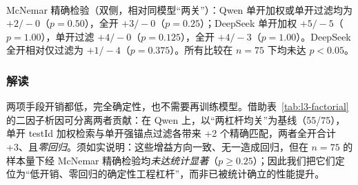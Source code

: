 \begin{table}[t]
\centering
\caption{L3 v0 $\to$ v1 端到端对比（75 个可达 koenig 失效）。v1 = v0 + testId 加权检索 + 强锚点后置过滤；v0 为两杠杆均关的统一权重基线。}
\label{tab:l3-levers}
\small
{}
\end{table}

\begin{table}[t]
\centering
\caption{两杠杆二因子析因（top-1 精确元素匹配，$n=75$）。行=testId 加权，列=强锚点后置过滤；上组为 Qwen 主实验，下组为 DeepSeek 模型泛化复现。}
\label{tab:l3-factorial}
\small
{}
\\[2pt]
{\scriptsize McNemar 精确检验（双侧，相对同模型“两关”）：Qwen 单开加权或单开过滤均为 $+2/-0$（$p=0.50$），全开 $+3/-0$（$p=0.25$）；DeepSeek 单开加权 $+5/-5$（$p=1.00$），单开过滤 $+4/-0$（$p=0.125$），全开 $+4/-3$（$p=1.00$）。DeepSeek 全开相对仅过滤为 $+1/-4$（$p=0.375$）。所有比较在 $n=75$ 下均未达 $p<0.05$。}
\end{table}

\subsubsection{解读}
两项手段开销都低，完全确定性，也不需要再训练模型。借助表~\ref{tab:l3-factorial} 的二因子析因可分离两者贡献：在 Qwen 上，以“两杠杆均关”为基线（55/75），单开 testId 加权检索与单开强锚点过滤各带来 +2 个精确匹配，两者全开合计 +3、且\emph{零回归}。须如实说明：这些增益方向一致、无一造成回归，但在 $n=75$ 的样本量下经 McNemar 精确检验均\emph{未达统计显著}（$p\ge0.25$）；因此我们把它们定位为“低开销、零回归的确定性工程杠杆”，而非已被统计确立的性能提升。

